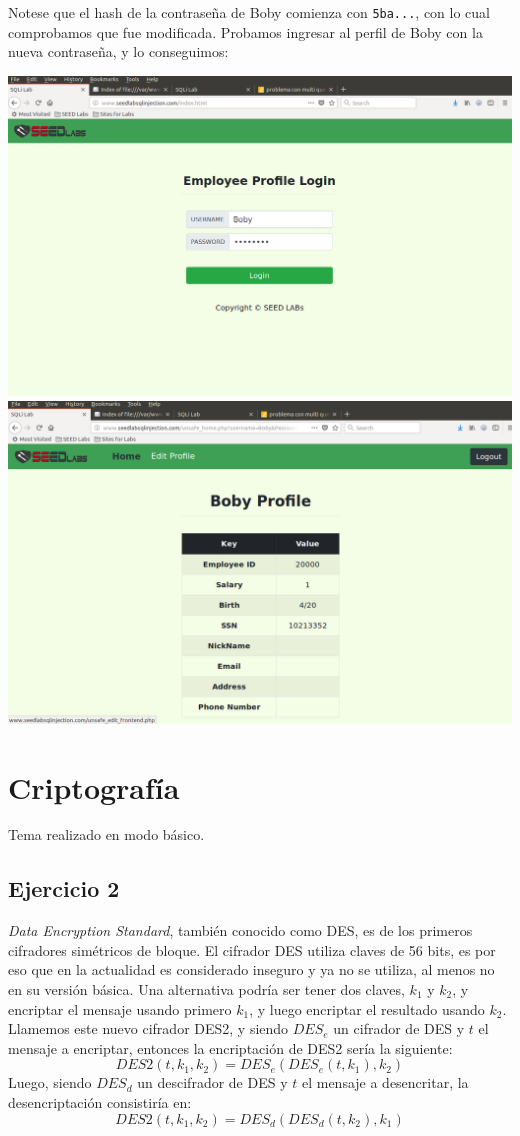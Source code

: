 \documentclass[11pt]{article}
\begin{document}
Notese que el hash de la contraseña de Boby comienza con \verb|5ba...|, con lo cual comprobamos que fue modificada.
Probamos ingresar al perfil de Boby con la nueva contraseña, y lo conseguimos:
\begin{center}
    \includegraphics[scale=.34]{task3_3_3_sql.png}
    \includegraphics[scale=.34]{task3_3_4_sql.png}
\end{center}


\section*{Criptografía}
Tema realizado en modo básico.

\subsection*{Ejercicio 2}
\textit{Data Encryption Standard}, también conocido como DES, es de los primeros cifradores simétricos de bloque.
El cifrador DES utiliza claves de 56 bits, es por eso que en la actualidad es considerado inseguro y ya no se 
utiliza, al menos no en su versión básica. Una alternativa podría ser tener dos claves, $k_1$ y $k_2$, y encriptar 
el mensaje usando primero $k_1$, y luego encriptar el resultado usando $k_2$. Llamemos este nuevo cifrador DES2, 
y siendo $DES_e$ un cifrador de DES y $t$ el mensaje a encriptar, entonces la encriptación 
de DES2 sería la siguiente:
$$DES2(t,k_1,k_2) = DES_e(DES_e(t,k_1),k_2)$$
Luego, siendo $DES_d$ un descifrador de DES y $t$ el mensaje a desencritar, la desencriptación consistiría en:
$$DES2(t,k_1,k_2) = DES_d(DES_d(t,k_2),k_1)$$
\end{document}
